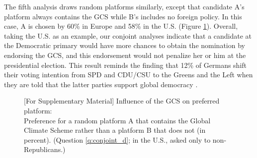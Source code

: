 \clearpage 
\noindent 
The fifth analysis draws random platforms similarly, except that candidate A's platform always contains the GCS while B's includes no foreign policy. In this case, A is chosen by 60\% in Europe %
and 58\% in the U.S. (Figure \ref{fig:conjoint_left_ag_b}). %
Overall, taking the U.S. as an example, our conjoint analyses indicate that a candidate at the Democratic primary would have more chances to obtain the nomination by endorsing the GCS, and this endorsement would not penalize her or him at the presidential election. This result reminds the finding that 12\% of Germans shift their voting intention from SPD and CDU/CSU to the Greens and the Left when they are told that the latter parties support global democracy \citep{ghassim_who_2020}.


\begin{figure}[h!]
    \caption[Influence of the GCS on preferred platform]{[For Supplementary Material] Influence of the GCS on preferred platform:\\ Preference for a random platform A that contains the Global Climate Scheme rather than a platform B that does not (in percent). (Question \ref{q:conjoint_d}; in the U.S., asked only to non-Republicans.)}\label{fig:conjoint_left_ag_b}
\end{figure}




